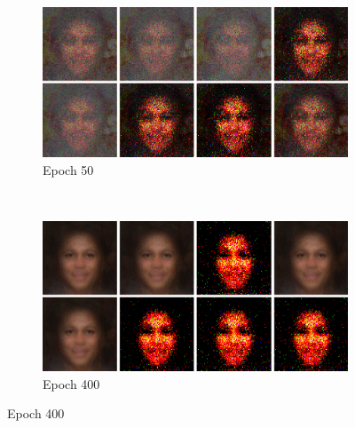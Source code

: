 \begin{figure}[h!]
    \centering
    \begin{subfigure}[b]{0.45\textwidth}
        \includegraphics[width=\textwidth]{fig/vae/ffhq_epoch50color}
        \caption{Epoch 50}
    \end{subfigure}
    ~
    \begin{subfigure}[b]{0.45\textwidth}
         \includegraphics[width=\textwidth]{fig/vae/ffhq_epoch400color}
        \caption{Epoch 400}
    \end{subfigure}


\end{figure}
